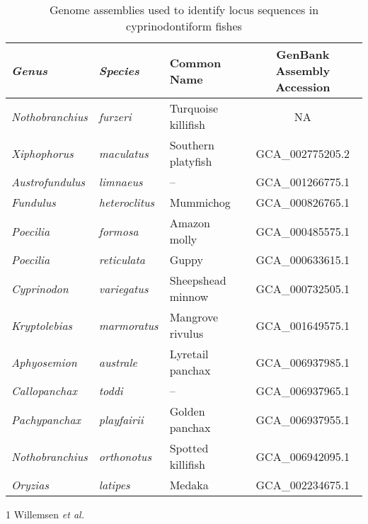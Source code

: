 \begin{table}[bh!]
\centering
\begin{threeparttable}
\begin{tabular}{>{\itshape}l>{\itshape}llc}\toprule
\textnormal{\textbf{Genus}} & \textnormal{\textbf{Species}} & \textbf{Common Name} & \textbf{GenBank Assembly Accession}\\\midrule
Nothobranchius & furzeri & Turquoise killifish & NA\tnote{1}\\\midrule
Xiphophorus & maculatus & Southern platyfish & GCA\_002775205.2\\
Austrofundulus & limnaeus & -- & GCA\_001266775.1\\
Fundulus & heteroclitus & Mummichog & GCA\_000826765.1\\
Poecilia & formosa & Amazon molly & GCA\_000485575.1\\
Poecilia & reticulata & Guppy & GCA\_000633615.1\\
Cyprinodon & variegatus & Sheepshead minnow & GCA\_000732505.1\\
Kryptolebias & marmoratus & Mangrove rivulus & GCA\_001649575.1\\\midrule
Aphyosemion & australe & Lyretail panchax & GCA\_006937985.1\\
Callopanchax & toddi & -- & GCA\_006937965.1\\
Pachypanchax & playfairii & Golden panchax & GCA\_006937955.1\\
Nothobranchius & orthonotus & Spotted killifish & GCA\_006942095.1\\\midrule
Oryzias & latipes & Medaka & GCA\_002234675.1\\
\bottomrule\end{tabular}
\begin{tablenotes}
\item[1] Willemsen \textit{et al.} \parencite{willemsen2019popgen}
\end{tablenotes}
\end{threeparttable}
\vspace{0.5em}
\caption{Genome assemblies used to identify \igh{} locus sequences in cyprinodontiform fishes}
\label{tab:cyprinodontiform-genomes}
\end{table}

